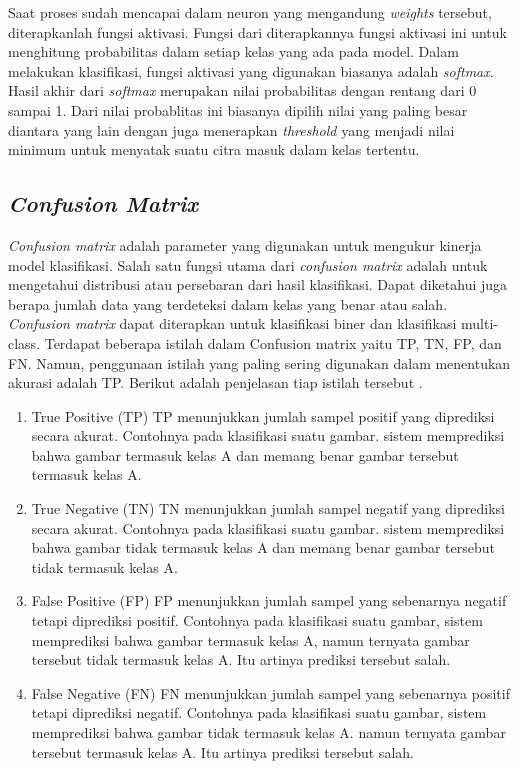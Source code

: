 Saat proses sudah mencapai dalam neuron yang mengandung \emph{weights} tersebut, diterapkanlah fungsi aktivasi. Fungsi dari diterapkannya fungsi aktivasi ini untuk menghitung probabilitas dalam setiap kelas yang ada pada model. Dalam melakukan klasifikasi, fungsi aktivasi yang digunakan biasanya adalah \emph{softmax}. Hasil akhir dari \emph{softmax} merupakan nilai probabilitas dengan rentang dari 0 sampai 1. Dari nilai probablitas ini biasanya dipilih nilai yang paling besar diantara yang lain dengan juga menerapkan \emph{threshold} yang menjadi nilai minimum untuk menyatak suatu citra masuk dalam kelas tertentu.

\subsection{\emph{Confusion Matrix}}

\emph{Confusion matrix} adalah parameter yang digunakan untuk mengukur kinerja model klasifikasi. Salah satu fungsi utama dari \emph{confusion matrix} adalah untuk mengetahui distribusi atau persebaran dari hasil klasifikasi. Dapat diketahui juga berapa jumlah data yang terdeteksi dalam kelas yang benar atau salah. \emph{Confusion matrix} dapat diterapkan untuk klasifikasi biner dan klasifikasi multi-class. Terdapat beberapa istilah dalam Confusion matrix yaitu TP, TN, FP, dan FN. Namun, penggunaan istilah yang paling sering digunakan dalam menentukan akurasi adalah TP. Berikut adalah penjelasan tiap istilah tersebut \parencite{MohammadReza}.

\begin{enumerate}[nolistsep]
  \item True Positive (TP)
  TP menunjukkan jumlah sampel positif yang diprediksi secara akurat. Contohnya pada klasifikasi suatu gambar. sistem memprediksi bahwa gambar termasuk kelas A dan memang benar gambar tersebut termasuk kelas A.
  \item True Negative (TN)
  TN menunjukkan jumlah sampel negatif yang diprediksi secara akurat. Contohnya pada klasifikasi suatu gambar. sistem memprediksi bahwa gambar tidak termasuk kelas A dan memang benar gambar tersebut tidak termasuk kelas A.
  \item False Positive (FP)
  FP menunjukkan jumlah sampel yang sebenarnya negatif tetapi diprediksi positif. Contohnya pada klasifikasi suatu gambar, sistem memprediksi bahwa gambar termasuk kelas A, namun ternyata gambar tersebut tidak termasuk kelas A. Itu artinya prediksi tersebut salah.
  \item False Negative (FN)
  FN menunjukkan jumlah sampel yang sebenarnya positif tetapi diprediksi negatif. Contohnya pada klasifikasi suatu gambar, sistem memprediksi bahwa gambar tidak termasuk kelas A. namun ternyata gambar tersebut termasuk kelas A. Itu artinya prediksi tersebut salah.
\end{enumerate}   

